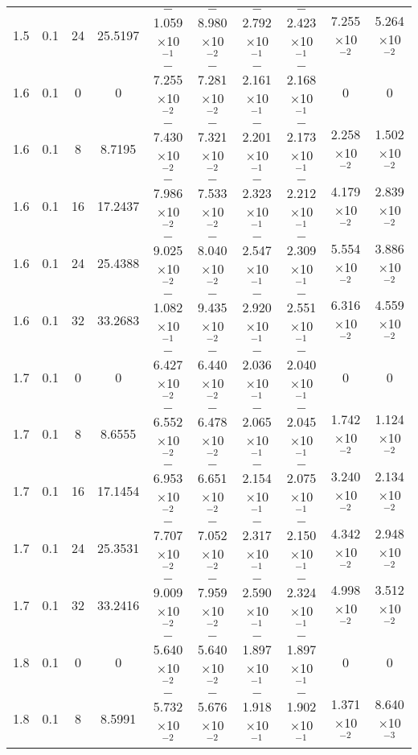 \documentclass[aps,prd,twocolumn,showpacs,groupedaddress,nofootinbib]{revtex4}
\begin{document}
\begin{widetext}
\begin{table}[h]
\begin{tabular}{|c|c|c|c|c|c|c|c|c|c|}
  1.5&  0.1& 24& 25.5197& $-$1.059$\times$10$^{-1}$& $-$8.980$\times$10$^{-2}$& $-$2.792$\times$10$^{-1}$& $-$2.423$\times$10$^{-1}$&  7.255$\times$10$^{-2}$&   5.264$\times$10$^{-2}$\\
  1.6&  0.1&  0&  0& $-$7.255$\times$10$^{-2}$& $-$7.281$\times$10$^{-2}$& $-$2.161$\times$10$^{-1}$& $-$2.168$\times$10$^{-1}$&  0&   0\\
  1.6&  0.1&  8&  8.7195& $-$7.430$\times$10$^{-2}$& $-$7.321$\times$10$^{-2}$& $-$2.201$\times$10$^{-1}$& $-$2.173$\times$10$^{-1}$&  2.258$\times$10$^{-2}$&   1.502$\times$10$^{-2}$\\
  1.6&  0.1& 16& 17.2437& $-$7.986$\times$10$^{-2}$& $-$7.533$\times$10$^{-2}$& $-$2.323$\times$10$^{-1}$& $-$2.212$\times$10$^{-1}$&  4.179$\times$10$^{-2}$&    2.839$\times$10$^{-2}$\\
  1.6&  0.1& 24& 25.4388& $-$9.025$\times$10$^{-2}$& $-$8.040$\times$10$^{-2}$& $-$2.547$\times$10$^{-1}$& $-$2.309$\times$10$^{-1}$&  5.554$\times$10$^{-2}$&    3.886$\times$10$^{-2}$\\
  1.6&  0.1& 32& 33.2683& $-$1.082$\times$10$^{-1}$& $-$9.435$\times$10$^{-2}$& $-$2.920$\times$10$^{-1}$& $-$2.551$\times$10$^{-1}$&  6.316$\times$10$^{-2}$&    4.559$\times$10$^{-2}$\\
  1.7&  0.1&  0&  0& $-$6.427$\times$10$^{-2}$& $-$6.440$\times$10$^{-2}$& $-$2.036$\times$10$^{-1}$& $-$2.040$\times$10$^{-1}$&  0&   0\\
  1.7&  0.1&  8&  8.6555& $-$6.552$\times$10$^{-2}$& $-$6.478$\times$10$^{-2}$& $-$2.065$\times$10$^{-1}$& $-$2.045$\times$10$^{-1}$&  1.742$\times$10$^{-2}$&    1.124$\times$10$^{-2}$\\
  1.7&  0.1& 16& 17.1454& $-$6.953$\times$10$^{-2}$& $-$6.651$\times$10$^{-2}$& $-$2.154$\times$10$^{-1}$& $-$2.075$\times$10$^{-1}$&  3.240$\times$10$^{-2}$&    2.134$\times$10$^{-2}$\\
  1.7&  0.1& 24& 25.3531& $-$7.707$\times$10$^{-2}$& $-$7.052$\times$10$^{-2}$& $-$2.317$\times$10$^{-1}$& $-$2.150$\times$10$^{-1}$&  4.342$\times$10$^{-2}$&    2.948$\times$10$^{-2}$\\
  1.7&  0.1& 32& 33.2416& $-$9.009$\times$10$^{-2}$& $-$7.959$\times$10$^{-2}$& $-$2.590$\times$10$^{-1}$& $-$2.324$\times$10$^{-1}$&  4.998$\times$10$^{-2}$&    3.512$\times$10$^{-2}$\\
  1.8&  0.1&  0&  0& $-$5.640$\times$10$^{-2}$& $-$5.640$\times$10$^{-2}$& $-$1.897$\times$10$^{-1}$& $-$1.897$\times$10$^{-1}$&  0&    0\\
  1.8&  0.1&  8&  8.5991& $-$5.732$\times$10$^{-2}$& $-$5.676$\times$10$^{-2}$& $-$1.918$\times$10$^{-1}$& $-$1.902$\times$10$^{-1}$&  1.371$\times$10$^{-2}$&    8.640$\times$10$^{-3}$\\

\end{tabular}
\end{table}
\end{widetext}
\end{document}
